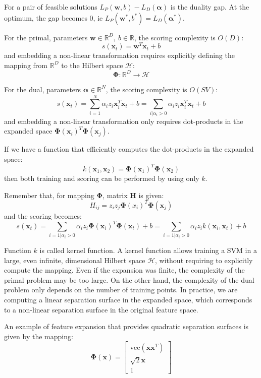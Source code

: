 For a pair of feasible solutions $L_P(\mathbf{w},b) - L_D(\boldsymbol{\alpha})$ is the duality gap. At the optimum, the
gap becomes 0, ie $L_P(\mathbf{w}^*, b^*) = L_D(\boldsymbol{\alpha}^*)$.

For the primal, parameters $\mathbf{w} \in \mathbb{R}^D,\ b \in \mathbb{R}$, the scoring complexity is $O(D)$:
\[
s(\mathbf{x}_t) = \mathbf{w}^T \mathbf{x}_t + b
\]
and embedding a non-linear transformation requires explicitly defining the mapping from
$\mathbb{R}^D$ to the Hilbert space $\mathcal{H}$:
\[
\boldsymbol{\Phi} : \mathbb{R}^D \longrightarrow \mathcal{H}
\]

For the dual, parameters $\boldsymbol{\alpha} \in \mathbb{R}^N$, the scoring complexity is $O(SV)$:
\[
s(\mathbf{x}_t) = \sum_{i=1}^N \alpha_i z_i \mathbf{x}_i^T \mathbf{x}_t + b = \sum_{i|\alpha_i > 0} \alpha_i z_i \mathbf{x}_i^T \mathbf{x}_t + b
\]
and embedding a non-linear transformation only requires dot-products in the expanded
space $\boldsymbol{\Phi}(\mathbf{x}_i)^T \boldsymbol{\Phi}(\mathbf{x}_j)$.

If we have a function that efficiently computes the dot-products in the expanded space:
\[
k(\mathbf{x}_1, \mathbf{x}_2) = \boldsymbol{\Phi}(\mathbf{x}_1)^T \boldsymbol{\Phi}(\mathbf{x}_2)
\]
then both training and scoring can be performed by using only $k$.

Remember that, for mapping $\boldsymbol{\Phi}$, matrix $\mathbf{H}$ is given:
\[
H_{ij} = z_i z_j \boldsymbol{\Phi}(x_i)^T \boldsymbol{\Phi}(\mathbf{x}_j)
\]
and the scoring becomes:
\[
s(\mathbf{x}_t) = \sum_{i=1|\alpha_i>0} \alpha_i z_i \boldsymbol{\Phi}(\mathbf{x}_i)^T \boldsymbol{\Phi}(\mathbf{x}_t) + b = \sum_{i=1|\alpha_i>0} \alpha_i z_i k(\mathbf{x}_i, \mathbf{x}_t) + b
\]

Function $k$ is called kernel function. A kernel function allows training a SVM in a large,
even infinite, dimensional Hilbert space $\mathcal{H}$, without requiring to explicitly compute the
mapping. Even if the expansion was finite, the complexity of the primal problem may be
too large. On the other hand, the complexity of the dual problem only depends on the
number of training points. In practice, we are computing a linear separation surface in the
expanded space, which corresponds to a non-linear separation surface in the original
feature space.

An example of feature expansion that provides quadratic separation surfaces is given by
the mapping:
\[
\boldsymbol{\Phi}(\mathbf{x}) = \begin{bmatrix} \text{vec}(\mathbf{x}\mathbf{x}^T) \\ \sqrt{2}\mathbf{x} \\ 1 \end{bmatrix}
\]

